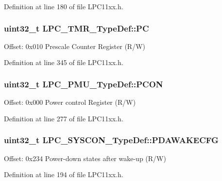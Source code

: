 Definition at line 180 of file L\+P\+C11xx.\+h.

\subsubsection[{\texorpdfstring{PC}{PC}}]{ uint32\+\_\+t L\+P\+C\+\_\+\+T\+M\+R\+\_\+\+Type\+Def\+::\+PC}\hypertarget{group___l_p_c11xx___definitions_ga847806a474e59a84685cff99373556ac}{}\label{group___l_p_c11xx___definitions_ga847806a474e59a84685cff99373556ac}
Offset\+: 0x010 Prescale Counter Register (R/W) 

Definition at line 345 of file L\+P\+C11xx.\+h.

\subsubsection[{\texorpdfstring{P\+C\+ON}{PCON}}]{ uint32\+\_\+t L\+P\+C\+\_\+\+P\+M\+U\+\_\+\+Type\+Def\+::\+P\+C\+ON}\hypertarget{group___l_p_c11xx___definitions_gace88fd565967e0b8a698ed05aa6a08f9}{}\label{group___l_p_c11xx___definitions_gace88fd565967e0b8a698ed05aa6a08f9}
Offset\+: 0x000 Power control Register (R/W) 

Definition at line 277 of file L\+P\+C11xx.\+h.

\subsubsection[{\texorpdfstring{P\+D\+A\+W\+A\+K\+E\+C\+FG}{PDAWAKECFG}}]{ uint32\+\_\+t L\+P\+C\+\_\+\+S\+Y\+S\+C\+O\+N\+\_\+\+Type\+Def\+::\+P\+D\+A\+W\+A\+K\+E\+C\+FG}\hypertarget{group___l_p_c11xx___definitions_ga6b9a0f3442dd4f5a8a6bb8bc54236e62}{}\label{group___l_p_c11xx___definitions_ga6b9a0f3442dd4f5a8a6bb8bc54236e62}
Offset\+: 0x234 Power-\/down states after wake-\/up (R/W) 

Definition at line 194 of file L\+P\+C11xx.\+h.

